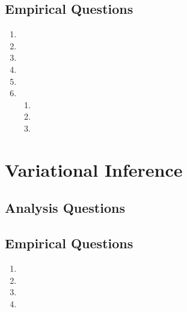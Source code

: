 \documentclass[11pt,a4paper]{article}
\begin{document}
	\subsection{Empirical Questions}
	\begin{enumerate}
		\item 
		\item 
		\item
		\item
		\item
		\item \begin{enumerate}
			\item 
			\item 
			\item 
		\end{enumerate}
	\end{enumerate}
	
	\section{Variational Inference}
	\subsection{Analysis Questions}
	
	\setcounter{subsection}{2}
	\subsection{Empirical Questions}
	\begin{enumerate}
		\item 
		\item
		\item
		\item
	\end{enumerate}
\end{document}
